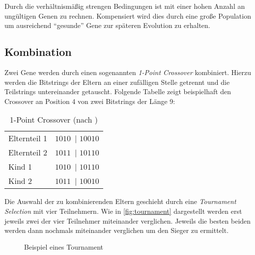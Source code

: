 Durch die verhältnismäßig strengen Bedingungen ist mit einer hohen Anzahl an ungültigen Genen zu rechnen.
Kompensiert wird dies durch eine große Population um ausreichend \enquote{gesunde} Gene zur späteren Evolution zu erhalten.




\subsection{Kombination}\label{sec:evol-alg-kombi}
Zwei Gene werden durch einen sogenannten \emph{1-Point Crossover} \cite{AJ2015} kombiniert.
Hierzu werden die Bitstrings der Eltern an einer zufälligen Stelle getrennt und die Teilstrings untereinander getauscht.
Folgende Tabelle zeigt beispielhaft den Crossover an Position 4 von zwei Bitstrings der Länge 9:

\begin{table}[ht]
    \begin{center}
        \begin{tabular}{l c}
            Elternteil 1 & \colorbox{lime!30}{$1010$~}$\mid$\colorbox{lime!30}{ $10010$} \\
            Elternteil 2 & \colorbox{cyan!30}{$1011$~}$\mid$\colorbox{cyan!30}{ $10110$} \\
            \hline
            Kind 1       & \colorbox{lime!30}{$1010$~}$\mid$\colorbox{cyan!30}{ $10110$} \\
            Kind 2       & \colorbox{cyan!30}{$1011$~}$\mid$\colorbox{lime!30}{ $10010$} \\
        \end{tabular}
    \end{center}
    \caption{1-Point Crossover (nach \cite{AJ2015})}
\end{table}

Die Auswahl der zu kombinierenden Eltern geschieht durch eine \emph{Tournament Selection} mit vier Teilnehmern.
Wie in \autoref{fig:tournament} dargestellt werden erst jeweils zwei der vier Teilnehmer miteinander verglichen.
Jeweils die besten beiden werden dann nochmals miteinander verglichen um den Sieger zu ermittelt.

\begin{figure}[h]
    \centering
    \caption{Beispiel eines Tournament}
    \label{fig:tournament}
\end{figure}

